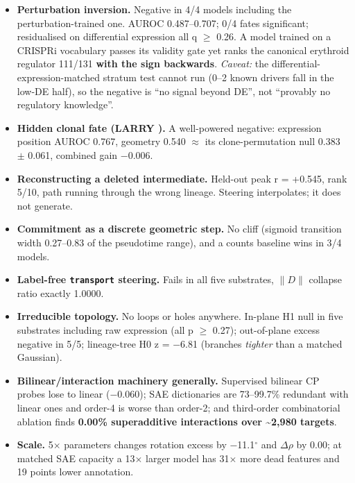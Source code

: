 \begin{itemize}
\tightlist
\item
  \textbf{Perturbation inversion.} Negative in 4/4 models including the perturbation-trained one. AUROC
  0.487--0.707; 0/4 fates significant; residualised on differential expression all q \(\ge\) 0.26. A model
  trained on a CRISPRi vocabulary passes its validity gate yet ranks the canonical erythroid regulator
  111/131 \textbf{with the sign backwards}. \emph{Caveat:} the differential-expression-matched stratum test cannot
  run (0--2 known drivers fall in the low-\textbar DE\textbar{} half), so the negative is ``no signal beyond DE'', not
  ``provably no regulatory knowledge''.
\item
  \textbf{Hidden clonal fate (LARRY \citep{weinreb2020larry}).} A well-powered negative: expression position AUROC 0.767, geometry
  0.540 \(\approx\) its clone-permutation null 0.383 \(\pm\) 0.061, combined gain \(-\)0.006.
\item
  \textbf{Reconstructing a deleted intermediate.} Held-out peak r = +0.545, rank 5/10, path running through
  the wrong lineage. Steering interpolates; it does not generate.
\item
  \textbf{Commitment as a discrete geometric step.} No cliff (sigmoid transition width 0.27--0.83 of the
  pseudotime range), and a counts baseline wins in 3/4 models.
\item
  \textbf{Label-free \texttt{transport} steering.} Fails in all five substrates, \(\lVert D\rVert\) collapse ratio exactly 1.0000.
\item
  \textbf{Irreducible topology.} No loops or holes anywhere. In-plane H1 null in five substrates including
  raw expression (all p \(\ge\) 0.27); out-of-plane excess negative in 5/5; lineage-tree H0 z = \(-\)6.81
  (branches \emph{tighter} than a matched Gaussian).
\item
  \textbf{Bilinear/interaction machinery generally.} Supervised bilinear CP probes lose to linear (\(-\)0.060);
  SAE dictionaries \citep{kendiukhov2026sae} are 73--99.7\% redundant with linear ones and order-4 is worse than order-2; and
  third-order combinatorial ablation finds \textbf{0.00\% superadditive interactions over \textasciitilde2,980 targets}.
\item
  \textbf{Scale.} 5\(\times\) parameters changes rotation excess by \(-\)11.1\(^{\circ}\) and \(\Delta\)\(\rho\) by 0.00; at matched SAE capacity a
  13\(\times\) larger model has 31\(\times\) more dead features and 19 points lower annotation.
\end{itemize}

